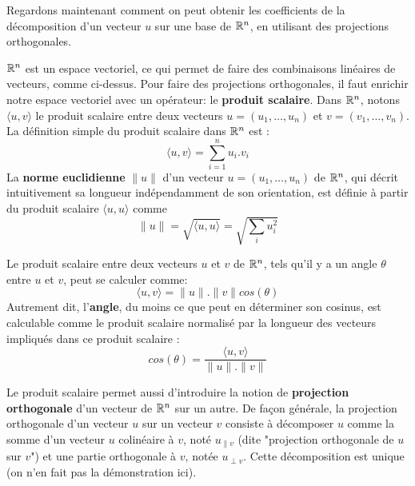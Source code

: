 Regardons maintenant comment on peut obtenir les coefficients de la décomposition d'un vecteur $u$ sur une base de $\mathbb{R}^n$, en utilisant des projections orthogonales. 

$\mathbb{R}^n$ est un espace vectoriel, ce qui permet de faire des combinaisons linéaires de vecteurs, comme ci-dessus. Pour faire des projections orthogonales, il faut enrichir notre espace vectoriel avec un opérateur: le \textbf{produit scalaire}. Dans $\mathbb{R}^n$, notons $\langle u , v \rangle$ le produit scalaire entre deux vecteurs $u=(u_1,\dots,u_n)$ et $v=(v_1,\dots,v_n)$. La définition simple du produit scalaire dans $\mathbb{R}^n$ est : 
\begin{equation}
\langle u , v \rangle = \sum_{i=1}^n u_i.v_i
\end{equation}
La \textbf{norme euclidienne} $\|u\|$ d'un vecteur $u=(u_1,\dots,u_n)$ de $\mathbb{R}^n$, qui décrit intuitivement sa longueur indépendamment de son orientation, est définie à partir du produit scalaire $\langle u, u \rangle$ comme 
\begin{equation}
\|u\|= \sqrt{\langle u, u \rangle}=\sqrt{\sum_i u_i^2}
\end{equation}

Le produit scalaire entre deux vecteurs $u$ et $v$ de $\mathbb{R}^n$, tels qu'il y a un angle $\theta$ entre $u$ et $v$, peut se calculer comme:
\begin{equation}
\langle u, v \rangle=\|u\|.\|v\|cos(\theta)
\end{equation}
Autrement dit, l'\textbf{angle}, du moins ce que peut en déterminer son cosinus, est calculable comme le produit scalaire normalisé par la longueur des vecteurs impliqués dans ce produit scalaire :
\begin{equation}
cos(\theta) = \frac{\langle u, v \rangle}{\|u\|.\|v\|}
\end{equation}

Le produit scalaire permet aussi d'introduire la notion de \textbf{projection orthogonale} d'un vecteur de $\mathbb{R}^n$ sur un autre. De façon générale, la projection orthogonale d'un vecteur $u$ sur un vecteur $v$ consiste à décomposer $u$ comme la somme d'un vecteur $u$ colinéaire à $v$, noté $u_{\| v}$ (dite "projection orthogonale de $u$ sur $v$") et une partie orthogonale à $v$, notée $u_{\perp v}$. Cette décomposition est unique (on n'en fait pas la démonstration ici).


